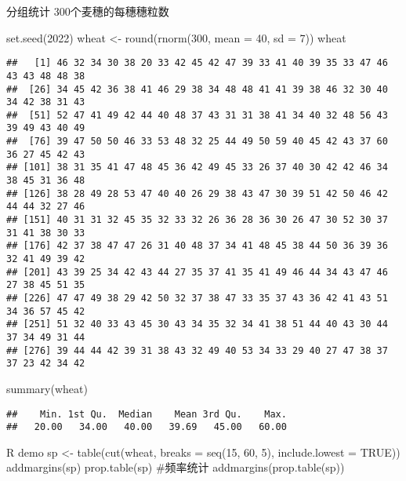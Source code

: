 \documentclass[
  10pt,
  ignorenonframetext,
]{beamer}
\newenvironment{Shaded}{\begin{snugshade}}{\end{snugshade}}
\newcommand{\AttributeTok}[1]{\textcolor[rgb]{0.77,0.63,0.00}{#1}}
\newcommand{\DecValTok}[1]{\textcolor[rgb]{0.00,0.00,0.81}{#1}}
\newcommand{\FunctionTok}[1]{\textcolor[rgb]{0.00,0.00,0.00}{#1}}
\newcommand{\NormalTok}[1]{#1}
\newcommand{\OtherTok}[1]{\textcolor[rgb]{0.56,0.35,0.01}{#1}}
\begin{document}
\begin{frame}[fragile]{分组统计}
\protect\hypertarget{ux5206ux7ec4ux7edfux8ba1}{}
300个麦穗的每穗穗粒数

\begin{Shaded}
\begin{Highlighting}[]
\FunctionTok{set.seed}\NormalTok{(}\DecValTok{2022}\NormalTok{)}
\NormalTok{wheat }\OtherTok{\textless{}{-}} \FunctionTok{round}\NormalTok{(}\FunctionTok{rnorm}\NormalTok{(}\DecValTok{300}\NormalTok{, }\AttributeTok{mean =} \DecValTok{40}\NormalTok{, }\AttributeTok{sd =} \DecValTok{7}\NormalTok{))}
\NormalTok{wheat}
\end{Highlighting}
\end{Shaded}

\begin{verbatim}
##   [1] 46 32 34 30 38 20 33 42 45 42 47 39 33 41 40 39 35 33 47 46 43 43 48 48 38
##  [26] 34 45 42 36 38 41 46 29 38 34 48 48 41 41 39 38 46 32 30 40 34 42 38 31 43
##  [51] 52 47 41 49 42 44 40 48 37 43 31 31 38 41 34 40 32 48 56 43 39 49 43 40 49
##  [76] 39 47 50 50 46 33 53 48 32 25 44 49 50 59 40 45 42 43 37 60 36 27 45 42 43
## [101] 38 31 35 41 47 48 45 36 42 49 45 33 26 37 40 30 42 42 46 34 38 45 31 36 48
## [126] 38 28 49 28 53 47 40 40 26 29 38 43 47 30 39 51 42 50 46 42 44 44 32 27 46
## [151] 40 31 31 32 45 35 32 33 32 26 36 28 36 30 26 47 30 52 30 37 31 41 38 30 33
## [176] 42 37 38 47 47 26 31 40 48 37 34 41 48 45 38 44 50 36 39 36 32 41 49 39 42
## [201] 43 39 25 34 42 43 44 27 35 37 41 35 41 49 46 44 34 43 47 46 27 38 45 51 35
## [226] 47 47 49 38 29 42 50 32 37 38 47 33 35 37 43 36 42 41 43 51 34 36 57 45 42
## [251] 51 32 40 33 43 45 30 43 34 35 32 34 41 38 51 44 40 43 30 44 37 34 49 31 44
## [276] 39 44 44 42 39 31 38 43 32 49 40 53 34 33 29 40 27 47 38 37 37 23 42 34 42
\end{verbatim}

\begin{Shaded}
\begin{Highlighting}[]
\FunctionTok{summary}\NormalTok{(wheat)}
\end{Highlighting}
\end{Shaded}

\begin{verbatim}
##    Min. 1st Qu.  Median    Mean 3rd Qu.    Max. 
##   20.00   34.00   40.00   39.69   45.00   60.00
\end{verbatim}
\end{frame}

\begin{frame}{R demo}
\protect\hypertarget{r-demo-1}{}
sp \textless- table(cut(wheat, breaks = seq(15, 60, 5), include.lowest =
TRUE)) addmargins(sp) prop.table(sp) \#频率统计
addmargins(prop.table(sp))
\end{frame}
\end{document}
